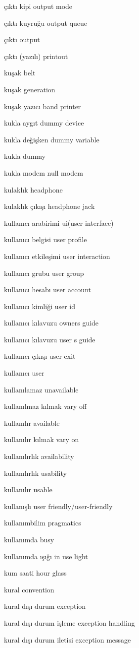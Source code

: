 \documentclass[12pt,fleqn]{article}\usepackage{../../common}
\begin{document}
çıktı kipi output mode

çıktı kuyruğu output queue

çıktı output

çıktı (yazılı) printout

kuşak belt

kuşak generation

kuşak yazıcı band printer

kukla aygıt dummy device

kukla değişken dummy variable

kukla dummy

kukla modem null modem

kulaklık headphone

kulaklık çıkışı headphone jack

kullanıcı arabirimi ui(user interface)

kullanıcı belgisi user profile

kullanıcı etkileşimi user interaction

kullanıcı grubu user group

kullanıcı hesabı user account

kullanıcı kimliği user id

kullanıcı kılavuzu owners guide

kullanıcı kılavuzu user s guide

kullanıcı çıkışı user exit

kullanıcı user

kullanılamaz unavailable

kullanılmaz kılmak vary off

kullanılır available

kullanılır kılmak vary on

kullanılırlık availability

kullanılırlık usability

kullanılır usable

kullanışlı user friendly/user-friendly

kullanımbilim pragmatics

kullanımda busy

kullanımda ışığı in use light

kum saati hour glass

kural convention

kural dışı durum exception

kural dışı durum işleme exception handling

kural dışı durum iletisi exception message
\end{document}
